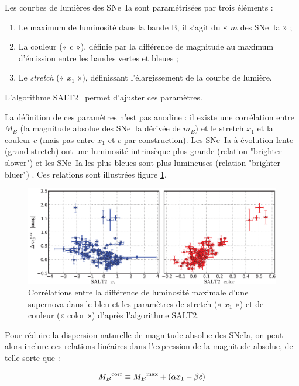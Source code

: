 \documentclass[a4paper, 12pt, svgnames]{article}
\begin{document}
Les courbes de lumières des SNe~Ia sont paramétrisées par trois éléments :

\begin{enumerate}
    \item Le maximum de luminosité dans la bande B, il s'agit du « $m$ des
        SNe~Ia » ;
    \item La couleur (« c »), définie par la différence de magnitude au maximum
        d'émission entre les bandes vertes et bleues ;
    \item Le \textit{stretch} (« $x_1$ »), définissant l'élargissement de la
        courbe de lumière.
\end{enumerate}

L'algorithme SALT2~\cite{guy_salt2_2007, guy_supernova_2010} permet d'ajuster
ces paramètres.

La définition de ces paramètres n'est pas anodine : il existe une corrélation
entre $M_B$ (la magnitude absolue des SNe~Ia dérivée de $m_B$) et le stretch
$x_1$ et la couleur $c$ (mais pas entre $x_1$ et $c$ par construction). Les
SNe~Ia à évolution lente (grand stretch) ont une luminosité intrinsèque plus
grande (relation "brighter-slower") \cite{phillips_99} et les
SNe~Ia les plus bleues sont plus lumineuses (relation "brighter-bluer")
\cite{tripp_two-parameter_1998, riess_first_2006}. Ces relations sont illustrées
figure \ref{brighter_slower_bluer}.

\begin{figure}[htbp!]
    \centering
    \includegraphics[width=.7\linewidth]{Rapport_figures/disp_x1_c.PNG}
    \captionsetup{justification=centering}
    \caption{Corrélations entre la différence de luminosité maximale d'une
    supernova dans le bleu et les paramètres de stretch (« $x_1$ ») et de
couleur (« color ») d'après l'algorithme SALT2.}
    \label{brighter_slower_bluer}
\end{figure}

Pour réduire la dispersion naturelle de magnitude absolue des SNeIa, on peut
alors inclure ces relations linéaires dans l'expression de la magnitude absolue,
de telle sorte que :

\begin{equation}
    M_B{}^{\text{corr}} \equiv M_B{}^{\text{max}} + \left(\alpha x_1 - \beta c\right)
\end{equation}
\end{document}

